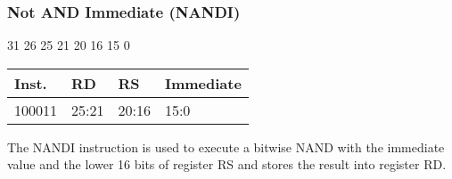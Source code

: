 \documentclass[12pt]{article}
\begin{document}

    \newpage
    \subsubsection{Not AND Immediate (NANDI)}
    
    \hspace{1.6cm}31 \hspace{1.15cm}26 \hspace{.05cm}25 \hspace{.8cm}21 \hspace{.05cm}20 \hspace{.8cm}16 \hspace{.05cm}15 \hspace{6.4cm}0
    \vspace{-.25cm}
    \begin{center}
        \begin{tabular}{ |p{1.8cm}|p{1.5cm}|p{1.5cm}|p{6.8cm}| }
            \hline
            \textbf{Inst.} & \textbf{RD} &  \textbf{RS} & \textbf{Immediate}\\
            \hline
            100011& 25:21 & 20:16 &15:0\\
            \hline
        \end{tabular}
    \end{center}
    
    \noindent
    The NANDI instruction is used to execute a bitwise NAND with the immediate value and the lower 16 bits of register RS and stores the result into register RD. 
    
\end{document}
